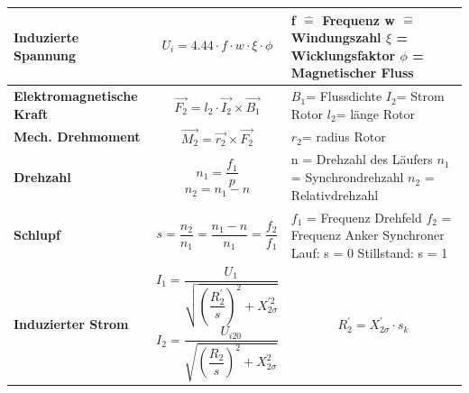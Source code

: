     \begin{longtable}{| p{} | p{} | p{} |}
    	\hline
    	\textbf{Induzierte Spannung} &
        \[ U_i = 4.44\cdot f\cdot w\cdot\xi\cdot\phi \] &
        f $\widehat{=}$ Frequenz \newline
        w $\widehat{=}$ Windungszahl \newline
        $\xi$ = Wicklungsfaktor \newline
        $\phi$ = Magnetischer Fluss
        \\ \hline
        
        \textbf{Elektromagnetische Kraft}	&
        \begin{equation*} \vec{F_2} = l_2\cdot\vec{I_2}\times\vec{B_1}\end{equation*} &
        $ B_1 $= Flussdichte\newline
        $ I_2 $= Strom Rotor        
        $ l_2 $= länge Rotor\newline
        \\ \hline
        
        \textbf{Mech. Drehmoment}	&
        \begin{equation*}\vec{M_2} = \vec{r_2}\times\vec{F_2}\end{equation*}&
        $ r_2 $= radius Rotor
        \\ \hline
        
        \textbf{Drehzahl}&
        \[ n_1= \frac{f_1}{p}\]
        \[ n_2=n_1 - n \]&
        n = Drehzahl des Läufers \newline
        $n_1$ = Synchrondrehzahl \newline
        $ n_2 $ = Relativdrehzahl
        \\ \hline
        
        \textbf{Schlupf}&
        \[ s= \frac{n_2}{n_1}=\frac{n_1-n}{n_1}=\frac{f_2}{f_1} \]&
        $ f_1 $ = Frequenz Drehfeld \newline
        $ f_2 $ = Frequenz Anker \newline
        Synchroner Lauf: s = 0 \newline
        Stillstand: s = 1
        \\ \hline 
        
        \textbf{Induzierter Strom}&
	     \[I_1=\frac{U_{1}}{\sqrt{\left(\dfrac{R_2^\prime}{s}\right)^2+X_{2\sigma}^{\prime 2}}}\] 
         \[ I_2 = \frac{U_{i20}}{\sqrt{\left(\dfrac{R_2}{s}\right)^2+X_{2\sigma}^2}} \]&
         \[ R_2^\prime= X_{2\sigma}^{\prime}\cdot s_k \]
         \\ \hline
            

\end{longtable}
